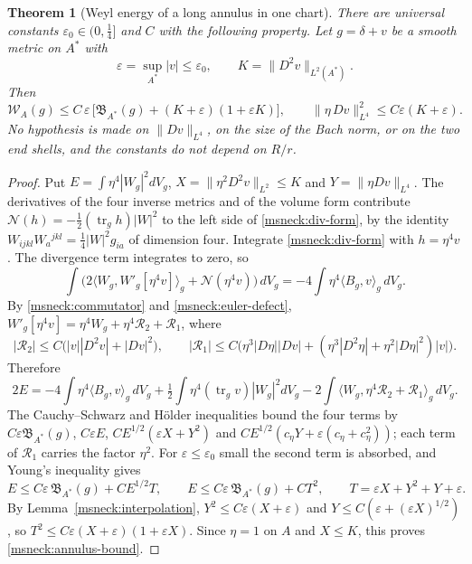 \documentclass[11pt]{article}
\numberwithin{equation}{section}
\newtheorem{theorem}{Theorem}[section]
\theoremstyle{definition}
\theoremstyle{remark}
\DeclareMathOperator{\tr}{tr}
\begin{document}
\begin{theorem}[Weyl energy of a long annulus in one chart]
\label{msneck:annulus}
There are universal constants \(\varepsilon_0\in(0,\tfrac14]\) and \(C\)
with the following property. Let \(g=\delta+v\) be a smooth metric on
\(A^*\) with
\[
 \varepsilon=\sup_{A^*}|v|\le\varepsilon_0,\qquad K=\|D^2v\|_{L^2(A^*)}.
\]
Then
\begin{equation}\label{msneck:annulus-bound}
 \mathcal W_A(g)\le C\,\varepsilon\,\bigl[\mathfrak B_{A^*}(g)
  +(K+\varepsilon)(1+\varepsilon K)\bigr],\qquad
 \|\eta\,Dv\|_{L^4}^2\le C\varepsilon(K+\varepsilon).
\end{equation}
No hypothesis is made on \(\|Dv\|_{L^4}\), on the size of the Bach
norm, or on the two end shells, and the constants do not depend on
\(R/r\).
\end{theorem}

\begin{proof}
Put \(E=\int\eta^4|W_g|^2dV_g\), \(X=\|\eta^2D^2v\|_{L^2}\le K\) and
\(Y=\|\eta Dv\|_{L^4}\). The derivatives of the four inverse metrics and
of the volume form contribute \(\mathcal N(h)=-\tfrac12(\tr_gh)|W|^2\) to
the left side of \eqref{msneck:div-form}, by the identity
\(W_{ijkl}W_a{}^{jkl}=\tfrac14|W|^2g_{ia}\) of dimension four. Integrate
\eqref{msneck:div-form} with \(h=\eta^4v\). The divergence term integrates
to zero, so
\[
 \int\bigl(2\langle W_g,W'_g[\eta^4v]\rangle_g+\mathcal N(\eta^4v)\bigr)\,dV_g
 =-4\int\eta^4\langle B_g,v\rangle_g\,dV_g .
\]
By \eqref{msneck:commutator} and \eqref{msneck:euler-defect},
\(W'_g[\eta^4v]=\eta^4W_g+\eta^4\mathcal R_2+\mathcal R_1\), where
\[
 |\mathcal R_2|\le C\bigl(|v||D^2v|+|Dv|^2\bigr),\qquad
 |\mathcal R_1|\le C\bigl(\eta^3|D\eta||Dv|
   +(\eta^3|D^2\eta|+\eta^2|D\eta|^2)|v|\bigr).
\]
Therefore
\begin{equation}\label{msneck:euler-identity}
 2E=-4\int\eta^4\langle B_g,v\rangle_g\,dV_g
   +\tfrac12\int\eta^4(\tr_gv)|W_g|^2dV_g
   -2\int\langle W_g,\eta^4\mathcal R_2+\mathcal R_1\rangle_g\,dV_g .
\end{equation}
The Cauchy--Schwarz and Hölder inequalities bound the four terms by
\(C\varepsilon\mathfrak B_{A^*}(g)\), \(C\varepsilon E\),
\(CE^{1/2}(\varepsilon X+Y^2)\) and
\(CE^{1/2}(c_\eta Y+\varepsilon(c_\eta+c_\eta^2))\); each term of
\(\mathcal R_1\) carries the factor \(\eta^2\). For \(\varepsilon\le\varepsilon_0\)
small the second term is absorbed, and Young's inequality gives
\begin{equation}\label{msneck:annulus-T}
 E\le C\varepsilon\,\mathfrak B_{A^*}(g)+CE^{1/2}T,\qquad
 E\le C\varepsilon\,\mathfrak B_{A^*}(g)+CT^2,\qquad
 T=\varepsilon X+Y^2+Y+\varepsilon .
\end{equation}
By Lemma~\ref{msneck:interpolation},
\(Y^2\le C\varepsilon(X+\varepsilon)\) and
\(Y\le C(\varepsilon+(\varepsilon X)^{1/2})\), so
\(T^2\le C\varepsilon(X+\varepsilon)(1+\varepsilon X)\). Since \(\eta=1\) on \(A\)
and \(X\le K\), this proves \eqref{msneck:annulus-bound}.
\end{proof}
\end{document}
